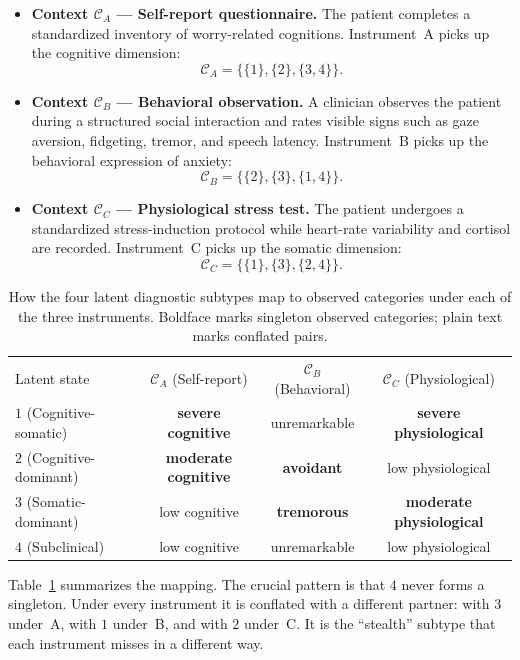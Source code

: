\documentclass[aps,pra,twocolumn,superscriptaddress,floatfix,longbibliography]{revtex4-2}
\begin{document}
\begin{itemize}
\item \textbf{Context $\mathcal{C}_A$ --- Self-report questionnaire.}
The patient completes a standardized inventory of worry-related
cognitions. Instrument~A picks up the cognitive dimension:
\[
\mathcal{C}_A=\{\{1\},\{2\},\{3,4\}\}.
\]

\item \textbf{Context $\mathcal{C}_B$ --- Behavioral observation.}
A clinician observes the patient during a structured social
interaction and rates visible signs such as gaze aversion, fidgeting,
tremor, and speech latency. Instrument~B picks up the behavioral
expression of anxiety:
\[
\mathcal{C}_B=\{\{2\},\{3\},\{1,4\}\}.
\]

\item \textbf{Context $\mathcal{C}_C$ --- Physiological stress test.}
The patient undergoes a standardized stress-induction protocol while
heart-rate variability and cortisol are recorded. Instrument~C picks
up the somatic dimension:
\[
\mathcal{C}_C=\{\{1\},\{3\},\{2,4\}\}.
\]
\end{itemize}

\begin{table}[htb]
\caption{\label{tab:clinical}How the four latent diagnostic
subtypes map to observed categories under each of the three
instruments. Boldface marks singleton observed categories; plain text
marks conflated pairs.}
\begin{ruledtabular}
\begin{tabular}{lccc}
Latent state & $\mathcal{C}_A$ (Self-report) &
  $\mathcal{C}_B$ (Behavioral) & $\mathcal{C}_C$ (Physiological)\\
\colrule
$1$ (Cognitive-somatic)  & \textbf{severe cognitive}  & unremarkable
  & \textbf{severe physiological}\\
$2$ (Cognitive-dominant)  & \textbf{moderate cognitive} & \textbf{avoidant}
  & low physiological\\
$3$ (Somatic-dominant)  & low cognitive  & \textbf{tremorous}
  & \textbf{moderate physiological}\\
$4$ (Subclinical) & low cognitive  & unremarkable
  & low physiological\\
\end{tabular}
\end{ruledtabular}
\end{table}

Table~\ref{tab:clinical} summarizes the mapping. The crucial pattern
is that $4$ never forms a singleton. Under every instrument it is
conflated with a different partner: with $3$ under~A, with $1$
under~B, and with $2$ under~C. It is the ``stealth'' subtype that
each instrument misses in a different way.
\end{document}
